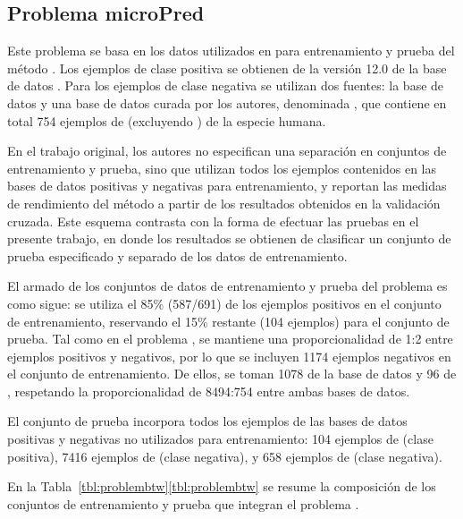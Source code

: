 %
%
\subsection{Problema microPred}
%
Este problema se basa en los datos utilizados en \cite{batuwita} para
entrenamiento y prueba del método \work{\micropred}.
Los ejemplos de clase positiva se obtienen de la versión 12.0 de la
base de datos \work{\mirbase}.
Para los ejemplos de clase negativa se utilizan dos fuentes: la base
de datos  y una base de datos curada por los autores,
denominada , que contiene en total 754
ejemplos de  (excluyendo ) de la especie humana.

En el trabajo original, los autores no especifican una separación
en conjuntos de entrenamiento y prueba, sino que utilizan todos los
ejemplos contenidos en las bases de datos positivas y negativas para
entrenamiento, y reportan las medidas de rendimiento del método
a partir de los resultados obtenidos en la validación cruzada.
Este esquema contrasta con la forma de efectuar las pruebas en el
presente trabajo, en donde los resultados se obtienen de clasificar un
conjunto de prueba especificado y separado de los datos de
entrenamiento.

El armado de los conjuntos de datos de entrenamiento y prueba del
problema \prob\micropred{} es como sigue:
se utiliza el 85\% (587/691) de los ejemplos positivos en el conjunto
de entrenamiento, reservando el 15\% restante (104 ejemplos) para el
conjunto de prueba.
Tal como en el problema \prob{\mipred}, se mantiene una
proporcionalidad de 1:2 entre ejemplos positivos y negativos, por lo
que se incluyen 1174 ejemplos negativos en el conjunto de
entrenamiento.
De ellos, se toman 1078 de la base de datos  y 96
de , respetando la proporcionalidad de
8494:754 entre ambas bases de datos.

El conjunto de prueba incorpora todos los ejemplos de las bases de
datos positivas y negativas no utilizados para entrenamiento: 104
ejemplos de  (clase positiva), 7416 ejemplos de
 (clase negativa), y 658 ejemplos de  (clase negativa).

En la \iflatexml{}Tabla~\ref{tbl:problembtw}\else\autoref{tbl:problembtw}\fi{}
se resume la composición de los conjuntos de entrenamiento y prueba
que integran el problema \prob\micropred.
